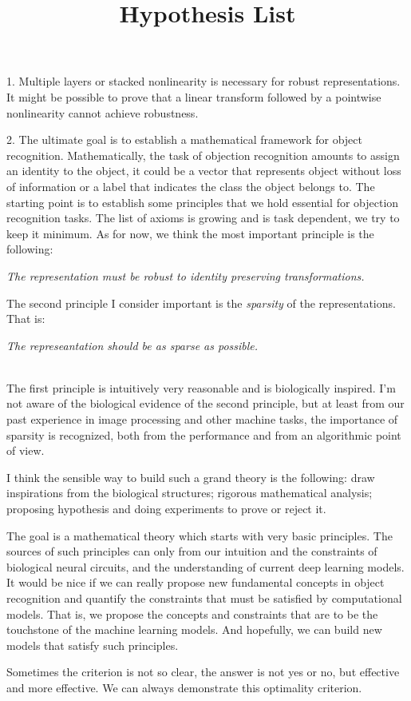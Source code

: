 \documentclass[12pt, reqno]{article}
\title{Hypothesis List}
\begin{document}
1. Multiple layers or stacked nonlinearity is necessary for robust representations. It might be possible to prove that a linear transform followed by a pointwise nonlinearity cannot achieve robustness.

2. The ultimate goal is to establish a mathematical framework for object recognition. Mathematically, the task of objection recognition amounts to assign an identity to the object, it could be a vector that represents object without loss of information or a label that indicates the class the object belongs to. The starting point is to establish some principles that we hold essential for objection recognition tasks. The list of axioms is growing and is task dependent, we try to keep it minimum. As for now, we think the most important principle is the following:
\newline
\centerline{\emph{The representation must be robust to identity preserving transformations.}}
\newline
The second principle I consider important is the \emph{sparsity} of the representations. That is:
\newline
\centerline{\emph{The represeantation should be as sparse as possible.}}\\

The first principle is intuitively very reasonable and is biologically inspired. I'm not aware of the biological evidence of the second principle, but at least from our past experience in image processing and other machine tasks, the importance of sparsity is recognized, both from the performance and from an algorithmic point of view. 

I think the sensible way to build such a grand theory is the following: draw inspirations from the biological structures; rigorous mathematical analysis; proposing hypothesis and doing experiments to prove or reject it.

The goal is a mathematical theory which starts with very basic principles. The sources of such principles can only from our intuition and the constraints of biological neural circuits, and the understanding of current deep learning models. It would be nice if we can really propose new fundamental concepts in object recognition and quantify the constraints that must be satisfied by computational models. That is, we propose the concepts and constraints that are to be the touchstone of the machine learning models. And hopefully, we can build new models that satisfy such principles. 

Sometimes the criterion is not so clear, the answer is not yes or no, but effective and more effective. We can always demonstrate this optimality criterion. 
\end{document}
